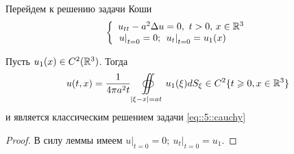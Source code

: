 \documentclass[../main.tex]{subfiles}
\begin{document}
Перейдем к решению задачи Коши
\begin{equation}
\left\{
  \begin{array}{ll}
  u_{tt}-a^2\Delta u=0,\ t>0,\, x\in \mathbb{R}^3\\
  \left. u\right|_{t=0}=0;\ \left. u_t\right|_{t=0}=u_1(x)
  \end{array}
\right.
\label{eq::5::cauchy}
\end{equation}
\begin{theorem}
Пусть $u_1(x)\in C^2(\mathbb{R}^3)$. Тогда 
\[
u(t,x)=\frac{1}{4\pi a^2t}\oiint\limits_{|\xi - x|=at}u_1(\xi )dS_{\xi}\in C^2\{t\geqslant 0, x\in \mathbb{R}^3 \}
\]
и является классическим решением задачи \eqref{eq::5::cauchy}
\end{theorem}
\begin{proof}
В силу леммы имеем $\left. u\right|_{t=0}=0;\ \left. u_t\right|_{t=0}=u_1$.


\end{proof}
\end{document}
